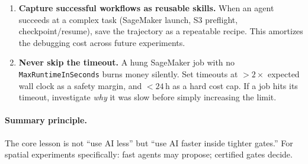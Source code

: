 \begin{enumerate}
\item \textbf{Capture successful workflows as reusable skills.} When an
  agent succeeds at a complex task (SageMaker launch, S3 preflight,
  checkpoint/resume), save the trajectory as a repeatable recipe. This
  amortizes the debugging cost across future experiments.

\item \textbf{Never skip the timeout.} A hung SageMaker job with no
  \texttt{MaxRuntimeInSeconds} burns money silently. Set timeouts at
  $>2\times$ expected wall clock as a safety margin, and $<24$\,h as a
  hard cost cap. If a job hits its timeout, investigate \emph{why} it was
  slow before simply increasing the limit.

\end{enumerate}

\paragraph{Summary principle.} The core lesson is not ``use AI less'' but
``use AI faster inside tighter gates.'' For spatial experiments
specifically: fast agents may propose; certified gates decide.
